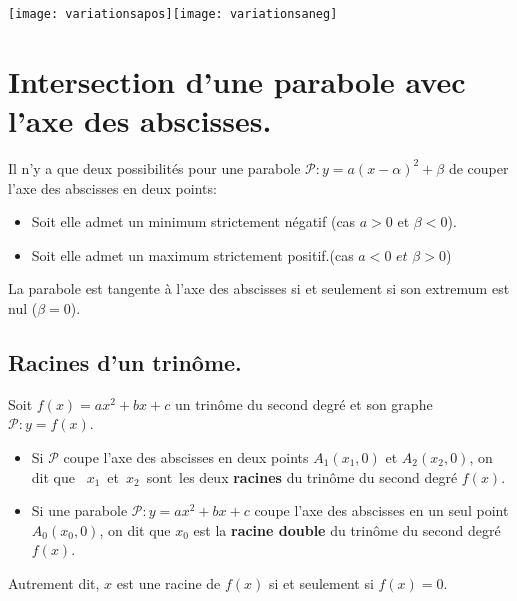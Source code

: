 \documentclass[a4paper,11pt]{article}
\theoremstyle{break}
\begin{document}
      \texttt{[image: variationsapos]}\hspace{1cm}\texttt{[image: variationsaneg]}
    

     
     \section{Intersection d'une parabole avec l'axe des abscisses.}
    
    \begin{Prop}
    Il n'y a que deux possibilités pour une parabole $\mathcal{P}:y=a(x-\alpha)^2+\beta$ 
    de couper l'axe des abscisses en deux points:
   \begin{itemize}
    \item Soit elle admet un minimum strictement négatif (cas $a>0$ et $\beta <0$).
    \item Soit elle admet un maximum strictement positif.(cas $a<0$ $et$ $\beta >0$)
   \end{itemize}
   
   La parabole est tangente à l'axe des abscisses si et seulement si son extremum est 
   nul ($\beta=0$).

  \end{Prop}
  
  
  \subsection{Racines d'un trinôme.}
  
  \begin{Def}
    Soit $f(x)=ax^2+bx+c$ un trinôme du second degré et son graphe $\mathcal{P}:y=f(x)$.
    \begin{itemize}
     \item 
    Si $\mathcal{P}$ coupe l'axe des abscisses en deux points 
    $A_1(x_1,0)$ et $A_2(x_2,0)$,
    on dit que \mbox{ $x_1$ et $x_2$ sont les} deux \textbf{racines} 
    du trinôme du second degré $f(x)$.
    
    \item
    Si une parabole $\mathcal{P}:y=ax^2+bx+c$ coupe l'axe des abscisses en un seul 
    point $A_0(x_0,0)$, on dit que $x_0$ est la \textbf{racine double} du trinôme du second 
    degré $f(x)$.
    
    
    \end{itemize}

    
    Autrement dit, $x$ est une racine de $f(x)$ si et seulement si $f(x)=0$.
  \end{Def}
  
\end{document}
